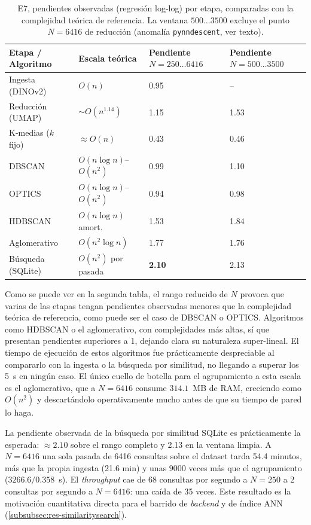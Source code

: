 \begin{table}[h]
  \centering
{\footnotesize
\begin{tabular}{|p{2.5cm}|p{3.4cm}|p{2.6cm}|p{2.6cm}|} \hline
  \textbf{Etapa / Algoritmo} & \textbf{Escala teórica} & \textbf{Pendiente $N{=}250\ldots6416$} & \textbf{Pendiente $N{=}500\ldots3500$} \\ \hline
  Ingesta (DINOv2)       & $O(n)$            & 0.95 & --   \\ \hline
  Reducción (UMAP)       & $\sim O(n^{1.14})$ & 1.15 & 1.53 \\ \hline
  K-medias ($k$ fijo)      & $\approx O(n)$    & 0.43 & 0.46 \\ \hline
  DBSCAN                 & $O(n\log n)$--$O(n^2)$ & 0.99 & 1.10 \\ \hline
  OPTICS                 & $O(n\log n)$--$O(n^2)$ & 0.94 & 0.98 \\ \hline
  HDBSCAN                & $O(n\log n)$ amort. & 1.53 & 1.84 \\ \hline
  Aglomerativo           & $O(n^2 \log n)$   & 1.77 & 1.76 \\ \hline
  Búsqueda (SQLite)      & $O(n^2)$ por pasada & \textbf{2.10} & 2.13 \\ \hline
\end{tabular}
}
  \caption[E7, pendientes observadas por etapa]{E7, pendientes observadas (regresión log-log) por etapa, comparadas
  con la complejidad teórica de referencia. La ventana $500\ldots3500$ excluye
el punto $N=6416$ de reducción (anomalía \texttt{pynndescent}, ver texto).}
  \label{tab:e7-slopes}
\end{table}

Como se puede ver en la segunda tabla, el rango reducido de $N$ provoca que
varias de las etapas tengan pendientes observadas menores que la complejidad
teórica de referencia, como puede ser el caso de DBSCAN o OPTICS. Algoritmos
como HDBSCAN o el aglomerativo, con complejidades más altas, sí que presentan
pendientes superiores a 1, dejando clara su naturaleza super-lineal. El tiempo
de ejecución de estos algoritmos fue prácticamente despreciable al compararlo
con la ingesta o la búsqueda por similitud, no llegando a superar los 5~s en
ningún caso. El único cuello de botella para el agrupamiento a esta escala es
el aglomerativo, que a $N=6416$ consume $314.1$~MB de RAM, creciendo como
$O(n^2)$ y descartándolo operativamente mucho antes de que su tiempo de pared
lo haga.

La pendiente observada de la búsqueda por similitud SQLite es prácticamente la
esperada: $\approx 2.10$ sobre el rango completo y 2.13 en la ventana limpia. A
$N=6416$ una sola pasada de 6416 consultas sobre el dataset tarda 54.4 minutos,
más que la propia ingesta (21.6 min) y unas $9000$ veces más que el
agrupamiento ($3266.6 / 0.358$~s). El \textit{throughput} cae de 68 consultas
por segundo a $N=250$ a 2 consultas por segundo a $N=6416$: una caída de
35 veces. Este resultado es la motivación cuantitativa directa para el
barrido de \textit{backend} y de índice ANN
(\ref{subsubsec:res-similaritysearch}).

